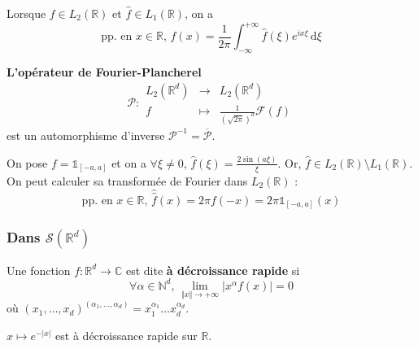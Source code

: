   \begin{corollary}
    Lorsque $f \in L_2(\mathbb{R})$ et $\widehat{f} \in L_1(\mathbb{R})$, on a
    \[ \text{pp. en } x \in \mathbb{R}, \, f(x) = \frac{1}{2 \pi} \int_{-\infty}^{+\infty} \widehat{f}(\xi) e^{ix\xi} \, \mathrm{d}\xi \]
  \end{corollary}

  \begin{theorem}
    \textbf{L'opérateur de Fourier-Plancherel}
    \[
    \mathcal{P} :
    \begin{array}{ccc}
      L_2(\mathbb{R}^d) &\rightarrow& L_2(\mathbb{R}^d) \\
      f &\mapsto& \frac{1}{(\sqrt{2 \pi})^d} \mathcal{F}(f)
    \end{array}
    \]
    est un automorphisme d'inverse $\mathcal{P}^{-1} = \overline{\mathcal{P}}$.
  \end{theorem}


  \begin{example}
    On pose $f = \mathbb{1}_{[-a, a]}$ et on a $\forall \xi \neq 0, \, \widehat{f}(\xi) = \frac{2 \sin(a\xi)}{\xi}$. Or, $\widehat{f} \in L_2(\mathbb{R}) \setminus L_1(\mathbb{R})$. On peut calculer sa transformée de Fourier dans $L_2(\mathbb{R})$ :
    \[ \text{pp. en } x \in \mathbb{R}, \, \widehat{\widehat{f}}(x) = 2\pi f(-x) = 2\pi\mathbb{1}_{[-a,a]}(x) \]
  \end{example}

  \subsubsection{Dans \texorpdfstring{$\mathcal{S}(\mathbb{R}^d)$}{S(Rᵈ)}}


  \begin{definition}
    Une fonction $f : \mathbb{R}^d \rightarrow \mathbb{C}$ est dite \textbf{à décroissance rapide} si
    \[ \forall \alpha \in \mathbb{N}^d, \, \lim_{\Vert x \Vert \rightarrow +\infty} \vert x^\alpha f(x) \vert = 0 \]
    où $(x_1, \dots, x_d)^{(\alpha_1, \dots, \alpha_d)} = x_1^{\alpha_1} \dots x_d^{\alpha_d}$.
  \end{definition}

  \begin{example}
    $x \mapsto e^{-\vert x \vert}$ est à décroissance rapide sur $\mathbb{R}$.
  \end{example}

